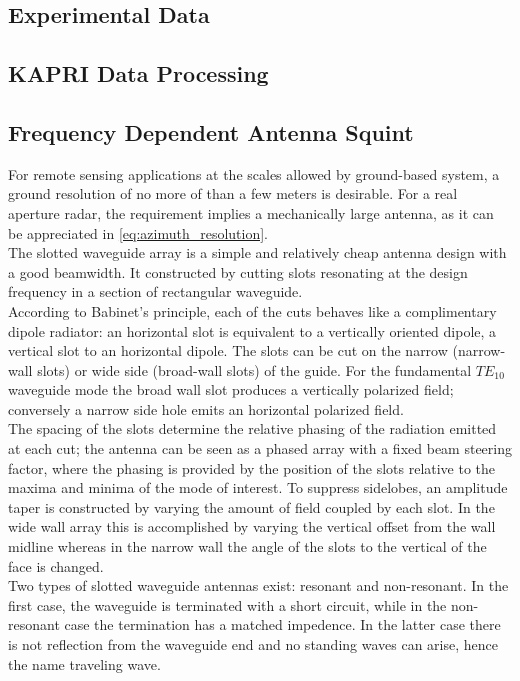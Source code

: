 \subsection{Experimental Data}

\subsection{KAPRI Data Processing}
\subsection{Frequency Dependent Antenna Squint}\label{sec:squint}
For remote sensing applications at the scales allowed by ground-based system, a ground resolution of no more of than a few meters is desirable. For a real aperture radar, the requirement implies a mechanically large antenna, as it can be appreciated in \autoref{eq:azimuth_resolution}.\\
The slotted waveguide array \cite{Hines1953a,Granet2007} is a simple and relatively cheap antenna design with a good beamwidth. It constructed by cutting slots resonating at the design frequency in a section of rectangular waveguide.\\
According to Babinet's principle\cite{kraus88}, each of the cuts behaves like a complimentary dipole radiator: an horizontal slot is equivalent to a vertically oriented dipole, a vertical slot to an horizontal dipole. The slots can be cut on the narrow (narrow-wall slots) or wide side (broad-wall slots) of the guide. For the fundamental $TE_{10}$ waveguide mode the broad wall slot produces a vertically polarized field; conversely a narrow side hole emits an horizontal polarized field\cite{Enjiu2013}.\\
The spacing of the slots determine the relative phasing of the radiation emitted at each cut; the antenna can be seen as a phased array with a fixed beam steering factor, where the phasing is provided by the position of the slots relative to the maxima and minima of the mode of interest. To suppress sidelobes, an amplitude taper is constructed by varying the amount of field coupled by each slot. In the wide wall array this is accomplished by varying the vertical offset from the wall midline whereas in the narrow wall the angle of the slots to the vertical of the face is changed.\\ Two types of slotted waveguide antennas exist: resonant and non-resonant. In the first case, the waveguide is terminated with a short circuit, while in the non-resonant case the termination has a matched impedence. In the latter case there is not reflection from the waveguide end and no standing waves can arise, hence the name traveling wave.
